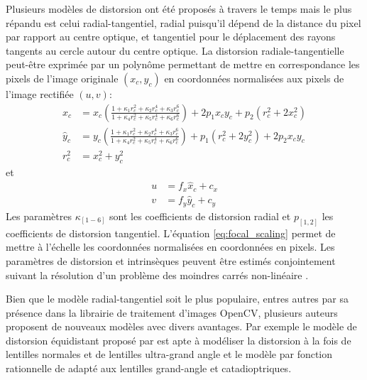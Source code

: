 Plusieurs modèles de distorsion ont été proposés à travers le temps mais le plus répandu est celui radial-tangentiel, radial puisqu'il dépend de la distance du pixel par rapport au centre optique, et tangentiel pour le déplacement des rayons tangents au cercle autour du centre optique. La distorsion radiale-tangentielle peut-être exprimée par un polynôme permettant de mettre en correspondance les pixels de l'image originale $(x_c, y_c)$ en coordonnées normalisées aux pixels de l'image rectifiée $(u, v)$:
\begin{equation}
  \begin{aligned}
    \hat{x}_c &= x_c\left(\frac{1 + \kappa_1r_c^2 + \kappa_2r_c^4 + \kappa_3r_c^6}{1 + \kappa_4r_c^2 + \kappa_5r_c^4 + \kappa_6r_c^6}\right) + 2p_1 x_c y_c + p_2(r_c^2 + 2 x_c^2) \\
    \hat{y}_c &= y_c\left(\frac{1 + \kappa_1r_c^2 + \kappa_2r_c^4 + \kappa_3r_c^6}{1 + \kappa_4r_c^2 + \kappa_5r_c^4 + \kappa_6r_c^6}\right) + p_1 (r_c^2 + 2 y_c^2) + 2p_2 x_c y_c \\
    r_c^2     &= x_c^2 + y_c^2
    \label{eq:rectification}
  \end{aligned}
\end{equation}
et
\begin{equation}
  \begin{aligned}
    u & = f_x \hat{x}_c + c_x\\
    v &= f_y \hat{y}_c + c_y
    \label{eq:focal_scaling}
  \end{aligned}
\end{equation}
Les paramètres $\kappa_{[1-6]}$ sont les coefficients de distorsion radial et $p_{[1,2]}$ les coefficients de distorsion tangentiel. L'équation \ref{eq:focal_scaling} permet de mettre à l'échelle les coordonnées normalisées en coordonnées en pixels. Les paramètres de distorsion et intrinsèques peuvent être estimés conjointement suivant la résolution d'un problème des moindres carrés non-linéaire \citep{Zhang2000}.

Bien que le modèle radial-tangentiel soit le plus populaire, entres autres par sa présence dans la librairie de traitement d'images OpenCV, plusieurs auteurs proposent de nouveaux modèles avec divers avantages. Par exemple le modèle de distorsion équidistant proposé par \cite{Kannala2006} est apte à modéliser la distorsion à la fois de lentilles normales et de lentilles ultra-grand angle et le modèle par fonction rationnelle de \cite{Claus2005} adapté aux lentilles grand-angle et catadioptriques.


